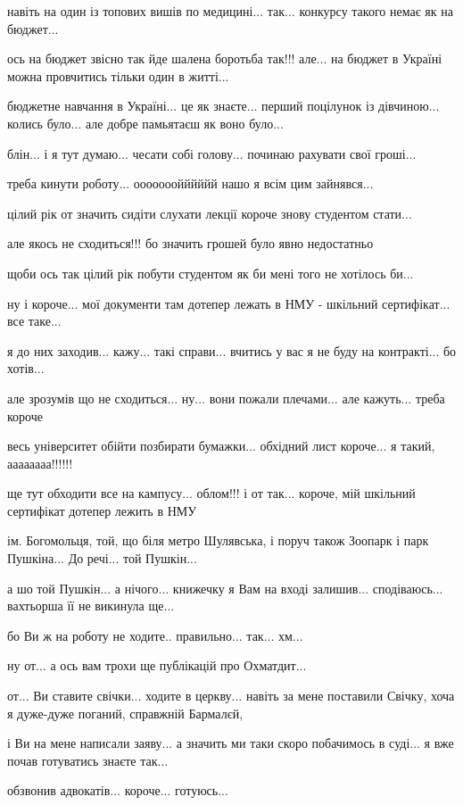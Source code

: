 навіть на один із топових вишів по медицині... так... конкурсу такого немає як на бюджет...

ось на бюджет звісно так йде шалена боротьба так!!! але... на бюджет в Україні можна провчитись тільки один в житті...

бюджетне навчання в Україні... це як знаєте... перший поцілунок із дівчиною... колись було... але добре памьятаєш як воно було...

блін... і я тут думаю... чесати собі голову... починаю рахувати свої гроші...

треба кинути роботу... ооооооойййййй нашо я всім цим зайнявся...

цілий рік от значить сидіти слухати лекції короче знову студентом стати...

але якось не сходиться!!! бо значить грошей було явно недостатньо

щоби ось так цілий рік побути студентом як би мені того не хотілось би...

ну і короче... мої документи там дотепер лежать в НМУ - шкільний сертифікат... все таке...

я до них заходив... кажу... такі справи... вчитись у вас я не буду на контракті... бо хотів...

але зрозумів що не сходиться... ну... вони пожали плечами... але кажуть... треба короче

весь університет обійти позбирати бумажки... обхідний лист короче... я такий, аааааааа!!!!!!

ще тут обходити все на кампусу... облом!!! і от так... короче, мій шкільний сертифікат дотепер лежить в НМУ

ім. Богомольця, той, що біля метро Шулявська, і поруч також Зоопарк і парк Пушкіна... До речі... той Пушкін...

а шо той Пушкін... а нічого... книжечку я Вам на вході залишив... сподіваюсь... вахтьорша її не викинула ще...

бо Ви ж на роботу не ходите.. правильно... так... хм...


ну от... а ось вам трохи ще публікацій про Охматдит...

от... Ви ставите свічки... ходите в церкву... навіть за мене поставили Свічку, хоча я дуже-дуже поганий, справжній Бармалєй,

і Ви на мене написали заяву... а значить ми таки скоро побачимось в суді... я вже почав готуватись знаєте так...

обзвонив адвокатів... короче... готуюсь...


